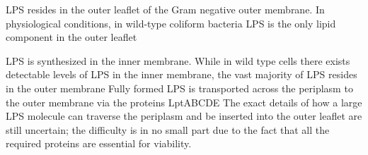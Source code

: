 \Ac{LPS} resides in the outer leaflet of the Gram negative outer membrane. In
physiological conditions, in wild-type coliform bacteria \ac{LPS} is the only lipid
component in the outer leaflet 

\Ac{LPS} is synthesized in the inner membrane. While in wild type cells there
exists detectable levels of \ac{LPS} in the inner membrane, the vast majority of
\ac{LPS} resides in the outer membrane Fully
formed \ac{LPS} is transported across the periplasm to the outer membrane via
the proteins LptABCDE The exact details of how a large \ac{LPS} molecule can
traverse the periplasm and be inserted into the outer leaflet are still uncertain;
the difficulty is in no small part due to the fact that all the required proteins
are essential for viability.

